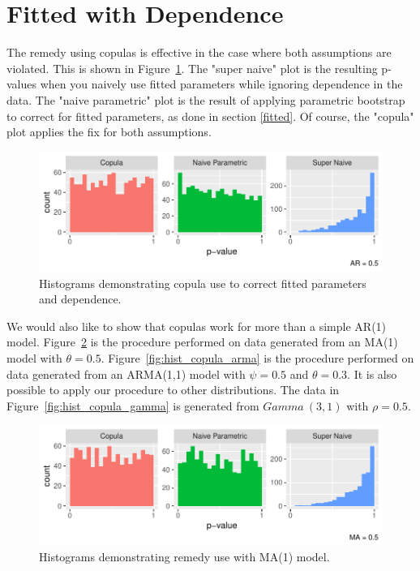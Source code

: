\documentclass[12pt, letterpaper, titlepage]{article}
\begin{document}
\hypertarget{sec:fittedwithdependence}{%
\section{Fitted with Dependence}\label{sec:fittedwithdependence}}

The remedy using copulas is effective in the case where both assumptions are violated.
This is shown in Figure~\ref{fig:hist_copula}. The "super naive" plot is the resulting 
p-values when you naively use fitted parameters while ignoring dependence in the data.
The "naive parametric" plot is the result of applying parametric bootstrap to correct
for fitted parameters, as done in section \ref{fitted}. Of course, the "copula" plot 
applies the fix for both assumptions.

\begin{figure}[tbp]
  \centering
  \includegraphics{hist_copula}
  \caption{Histograms demonstrating copula use to correct fitted parameters and dependence.}
  \label{fig:hist_copula}
\end{figure}

We would also like to show that copulas work for more than a simple AR(1) model. 
Figure~\ref{fig:hist_copula_ma1} is the procedure performed on data generated from 
an MA(1) model with $\theta = 0.5$. Figure~\ref{fig:hist_copula_arma} is the procedure 
performed on data generated from an ARMA(1,1) model with $\psi = 0.5$ and $\theta = 0.3$. 
It is also possible to apply our procedure to other distributions. The data in Figure~\ref{fig:hist_copula_gamma} is generated from $Gamma ~ (3,1)$ with $\rho = 0.5$.

\begin{figure}[tbp]
  \centering
  \includegraphics{hist_copula_ma1}
  \caption{Histograms demonstrating remedy use with MA(1) model.}
  \label{fig:hist_copula_ma1}
\end{figure}
\end{document}
